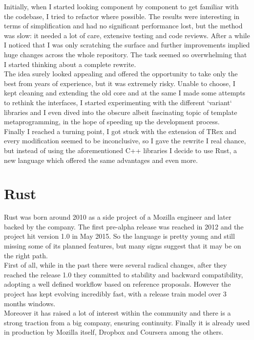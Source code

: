 Initially, when I started looking component by component to get familiar with the codebase, I tried to refactor where possible. The results were interesting in terms of simplification and had no significant performance lost, but the method was slow: it needed a lot of care, extensive testing and code reviews. After a while I noticed that I was only scratching the surface and further improvements implied huge changes across the whole repository. The task seemed so overwhelming that I started thinking about a complete rewrite.\\
The idea surely looked appealing and offered the opportunity to take only the best from years of experience, but it was extremely risky. Unable to choose, I kept cleaning and extending the old core and at the same I made some attempts to rethink the interfaces, I started experimenting with the different `variant` libraries and I even dived into the obscure albeit fascinating topic of template metaprogramming, in the hope of speeding up the development process.\\
Finally I reached a turning point, I got stuck with the extension of TRex and every modification seemed to be inconclusive, so I gave the rewrite I real chance, but instead of using the aforementioned C++ libraries I decide to use Rust, a new language which offered the same advantages and even more. 

\section{Rust}
Rust was born around 2010 as a side project of a Mozilla engineer and later backed by the company. The first pre-alpha release was reached in 2012 and the project hit version 1.0 in May 2015. So the language is pretty young and still missing some of its planned features, but many signs suggest that it may be on the right path.\\
First of all, while in the past there were several radical changes, after they reached the release 1.0 they committed to stability and backward compatibility, adopting a well defined workflow based on reference proposals. However the project has kept evolving incredibly fast, with a release train model over 3 months windows.\\
Moreover it has raised a lot of interest within the community and there is a strong traction from a big company, ensuring continuity. Finally it is already used in production by Mozilla itself, Dropbox and Coursera among the others.

